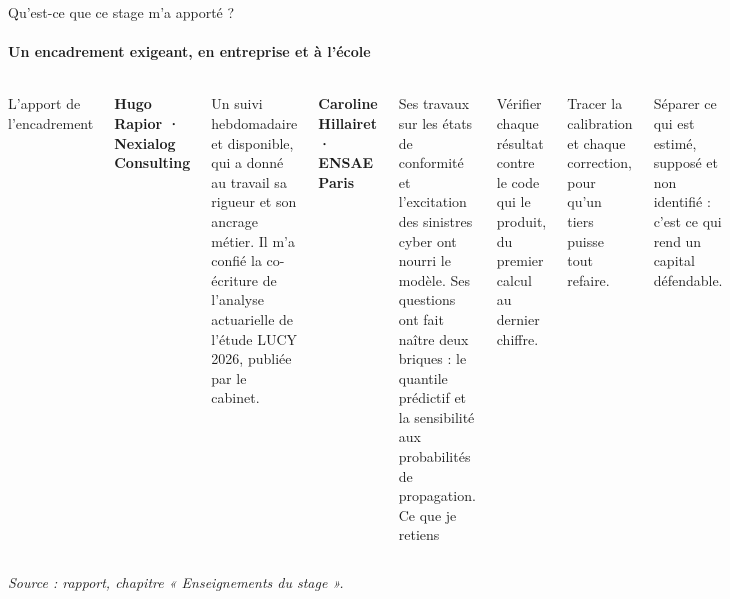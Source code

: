 \documentclass[aspectratio=169,10pt,t]{beamer}
\newcommand{\source}[1]{\par\vfill{\tiny\color{gris}\textit{Source : #1}}\par\vspace{-1mm}}
\begin{document}
\begin{frame}{Qu'est-ce que ce stage m'a apporté ?}
  \suivimethode{}{}
  \framesubtitle{Un encadrement exigeant, en entreprise et à l'école}
  \begin{columns}[T]
    {\editorial\normalsize L'apport de l'encadrement}\par\vspace{3mm}
    \small\textbf{Hugo Rapior · Nexialog Consulting}\par\vspace{1mm}
    Un suivi hebdomadaire et disponible, qui a donné au travail sa rigueur et son ancrage métier.
    Il m'a confié la co-écriture de l'analyse actuarielle de l'étude LUCY 2026, publiée par le cabinet.\par\vspace{3mm}
    \textbf{Caroline Hillairet · ENSAE Paris}\par\vspace{1mm}
    Ses travaux sur les états de conformité et l'excitation des sinistres cyber ont nourri le modèle.
    Ses questions ont fait naître deux briques : le quantile prédictif et la sensibilité aux probabilités de propagation.
    {\editorial\normalsize Ce que je retiens}\par\vspace{3mm}
    \small Vérifier chaque résultat contre le code qui le produit, du premier calcul au dernier chiffre.\par\vspace{3mm}
    Tracer la calibration et chaque correction, pour qu'un tiers puisse tout refaire.\par\vspace{3mm}
    Séparer ce qui est estimé, supposé et non identifié : c'est ce qui rend un capital défendable.
  \end{columns}
  \source{rapport, chapitre « Enseignements du stage ».}
\end{frame}


\end{document}

